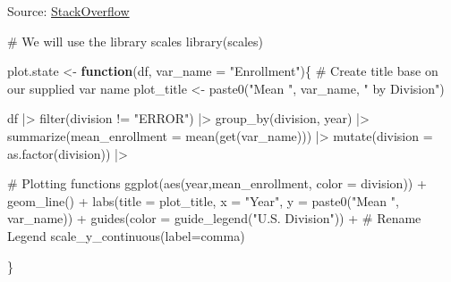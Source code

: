 \documentclass[
  letterpaper,
  DIV=11,
  numbers=noendperiod]{scrartcl}
\newenvironment{Shaded}{\begin{snugshade}}{\end{snugshade}}
\newcommand{\AttributeTok}[1]{\textcolor[rgb]{0.40,0.45,0.13}{#1}}
\newcommand{\CommentTok}[1]{\textcolor[rgb]{0.37,0.37,0.37}{#1}}
\newcommand{\ControlFlowTok}[1]{\textcolor[rgb]{0.00,0.23,0.31}{\textbf{#1}}}
\newcommand{\FunctionTok}[1]{\textcolor[rgb]{0.28,0.35,0.67}{#1}}
\newcommand{\NormalTok}[1]{\textcolor[rgb]{0.00,0.23,0.31}{#1}}
\newcommand{\OtherTok}[1]{\textcolor[rgb]{0.00,0.23,0.31}{#1}}
\newcommand{\SpecialCharTok}[1]{\textcolor[rgb]{0.37,0.37,0.37}{#1}}
\newcommand{\StringTok}[1]{\textcolor[rgb]{0.13,0.47,0.30}{#1}}
\begin{document}
Source:
\href{https://stackoverflow.com/questions/52602503/display-an-axis-value-in-millions-in-ggplot}{StackOverflow}

\begin{Shaded}
\begin{Highlighting}[]
\CommentTok{\# We will use the library scales}
\FunctionTok{library}\NormalTok{(scales)}
\end{Highlighting}
\end{Shaded}

\begin{Shaded}
\begin{Highlighting}[]
\NormalTok{plot.state }\OtherTok{\textless{}{-}} \ControlFlowTok{function}\NormalTok{(df, }\AttributeTok{var\_name =} \StringTok{"Enrollment"}\NormalTok{)\{}
  \CommentTok{\# Create title base on our supplied var name}
\NormalTok{  plot\_title }\OtherTok{\textless{}{-}} \FunctionTok{paste0}\NormalTok{(}\StringTok{"Mean "}\NormalTok{, var\_name, }\StringTok{" by Division"}\NormalTok{)}
  
\NormalTok{  df }\SpecialCharTok{|\textgreater{}} 
    \FunctionTok{filter}\NormalTok{(division }\SpecialCharTok{!=} \StringTok{"ERROR"}\NormalTok{) }\SpecialCharTok{|\textgreater{}}
    \FunctionTok{group\_by}\NormalTok{(division, year) }\SpecialCharTok{|\textgreater{}} 
    \FunctionTok{summarize}\NormalTok{(}\AttributeTok{mean\_enrollment =} \FunctionTok{mean}\NormalTok{(}\FunctionTok{get}\NormalTok{(var\_name))) }\SpecialCharTok{|\textgreater{}}
    \FunctionTok{mutate}\NormalTok{(}\AttributeTok{division =} \FunctionTok{as.factor}\NormalTok{(division)) }\SpecialCharTok{|\textgreater{}} 
    
    \CommentTok{\# Plotting functions}
    \FunctionTok{ggplot}\NormalTok{(}\FunctionTok{aes}\NormalTok{(year,mean\_enrollment, }\AttributeTok{color =}\NormalTok{ division)) }\SpecialCharTok{+}
    \FunctionTok{geom\_line}\NormalTok{() }\SpecialCharTok{+} 
    \FunctionTok{labs}\NormalTok{(}\AttributeTok{title =}\NormalTok{ plot\_title, }\AttributeTok{x =} \StringTok{"Year"}\NormalTok{, }\AttributeTok{y =} \FunctionTok{paste0}\NormalTok{(}\StringTok{"Mean "}\NormalTok{, var\_name)) }\SpecialCharTok{+}
    \FunctionTok{guides}\NormalTok{(}\AttributeTok{color =} \FunctionTok{guide\_legend}\NormalTok{(}\StringTok{"U.S. Division"}\NormalTok{)) }\SpecialCharTok{+} \CommentTok{\# Rename Legend}
    \FunctionTok{scale\_y\_continuous}\NormalTok{(}\AttributeTok{label=}\NormalTok{comma)}
    
\NormalTok{\}}
\end{Highlighting}
\end{Shaded}
\end{document}
